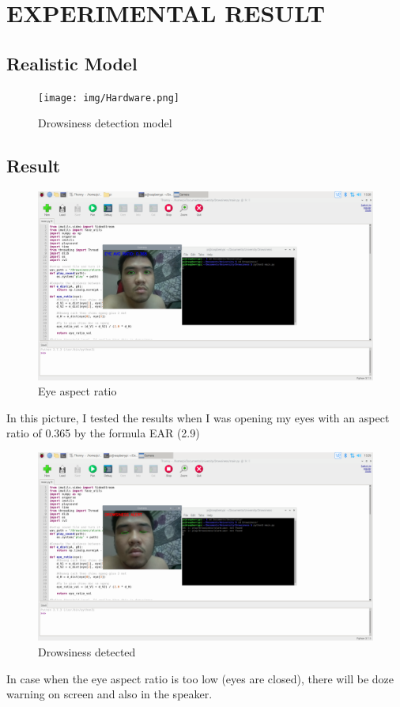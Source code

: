 \chapter{EXPERIMENTAL RESULT}

\renewcommand{\headrulewidth}{0.5pt}
\renewcommand{\footrulewidth}{0.5pt}
\thispagestyle{plain}
\pagestyle{fancy}
\fancyhf{}
\raggedright
{}

\justifying

\section{Realistic Model}
    \begin{figure}[H]
        \centering
        \texttt{[image: img/Hardware.png]}
        \caption{Drowsiness detection model}
    \end{figure}
\section{Result}
    \begin{figure}[H]
        \centering
        \includegraphics[width=0.8\linewidth]{img/run.png}
        \caption{Eye aspect ratio}
    \end{figure}
    In this picture, I tested the results when I was opening my eyes with an aspect ratio of 0.365 by the formula EAR (2.9)
    \begin{figure}[H]
        \centering
        \includegraphics[width=0.8\linewidth]{img/result.png}
        \caption{Drowsiness detected}
    \end{figure}
    In case when the eye aspect ratio is too low (eyes are closed), there will be doze warning on screen and also in the speaker.